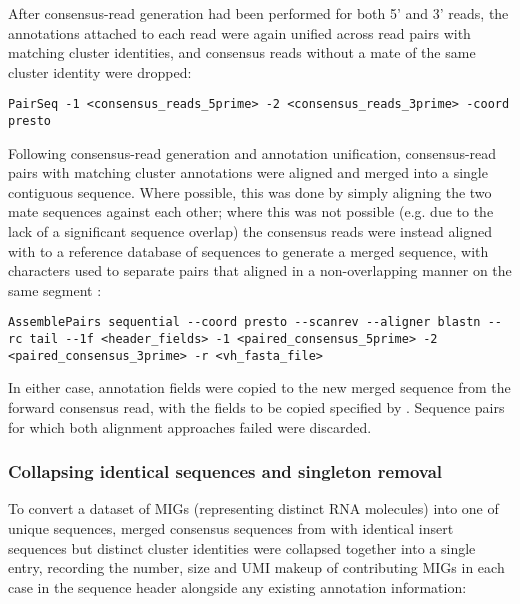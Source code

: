 After consensus-read generation had been performed for both 5' and 3' reads, the annotations attached to each read were again unified across read pairs with matching cluster identities, and consensus reads without a mate of the same cluster identity were dropped:

\begin{lstlisting}
PairSeq -1 <consensus_reads_5prime> -2 <consensus_reads_3prime> -coord presto
\end{lstlisting}

\noindent Following consensus-read generation and annotation unification, consensus-read pairs with matching cluster annotations were aligned and merged into a single contiguous sequence. Where possible, this was done by simply aligning the two mate sequences against each other; where this was not possible (e.g. due to the lack of a significant sequence overlap) the consensus reads were instead aligned with  \parencite{altschul1990blast,altschul1997blast} to a reference database of \vh sequences to generate a merged sequence, with  characters used to separate pairs that aligned in a non-overlapping manner on the same \vh segment \parencite{vanderheiden2014presto}:

\begin{lstlisting}
AssemblePairs sequential --coord presto --scanrev --aligner blastn --rc tail --1f <header_fields> -1 <paired_consensus_5prime> -2 <paired_consensus_3prime> -r <vh_fasta_file>
\end{lstlisting}

\noindent In either case, annotation fields were copied to the new merged sequence from the forward consensus read, with the fields to be copied specified by . Sequence pairs for which both alignment approaches failed were discarded.

\subsubsection{Collapsing identical sequences and singleton removal}
\label{sec:methods_comp_igpreproc_collapse}

To convert a dataset of MIGs (representing distinct RNA molecules) into one of unique sequences, merged consensus sequences from  with identical insert sequences but distinct cluster identities were collapsed together into a single  entry, recording the number, size and UMI makeup of contributing MIGs in each case in the sequence header alongside any existing annotation information:

